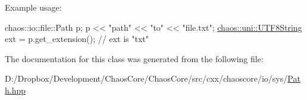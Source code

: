 Example usage\+:


\begin{DoxyCode}
chaos::io::file::Path p;
p << \textcolor{stringliteral}{"path"} << \textcolor{stringliteral}{"to"} << \textcolor{stringliteral}{"file.txt"};
\hyperlink{classchaos_1_1uni_1_1_u_t_f8_string}{chaos::uni::UTF8String} ext = p.get\_extension();
\textcolor{comment}{// ext is "txt"}
\end{DoxyCode}
 

The documentation for this class was generated from the following file\+:\begin{DoxyCompactItemize}
\item 
D\+:/\+Dropbox/\+Development/\+Chaos\+Core/\+Chaos\+Core/src/cxx/chaoscore/io/sys/\hyperlink{_path_8hpp}{Path.\+hpp}\end{DoxyCompactItemize}
